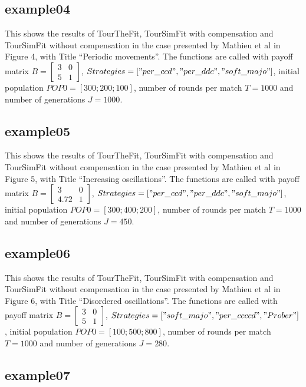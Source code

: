 \documentclass[12pt]{article}
\begin{document}
\subsection{example04}
This shows the results of TourTheFit, TourSimFit with compensation and TourSimFit without compensation in the case presented by Mathieu et al in Figure 4, with Title ``Periodic movements''. The functions are called with payoff matrix $B = \begin{bmatrix} 3 & 0 \\ 5 & 1 \end{bmatrix}$, $Strategies = ["per\_ccd", "per\_ddc", "soft\_majo"]$, initial population $POP0 = [300; 200; 100]$, number of rounds per match $T = 1000$ and number of generations $J = 1000$.

\subsection{example05}
This shows the results of TourTheFit, TourSimFit with compensation and TourSimFit without compensation in the case presented by Mathieu et al in Figure 5, with Title ``Increasing oscillations''. The functions are called with payoff matrix $B = \begin{bmatrix} 3 & 0 \\ 4.72 & 1 \end{bmatrix}$, $Strategies = ["per\_ccd", "per\_ddc", "soft\_majo"]$, initial population $POP0 = [300; 400; 200]$, number of rounds per match $T = 1000$ and number of generations $J = 450$.

\subsection{example06}
This shows the results of TourTheFit, TourSimFit with compensation and TourSimFit without compensation in the case presented by Mathieu et al in Figure 6, with Title ``Disordered oscillations''. The functions are called with payoff matrix $B = \begin{bmatrix} 3 & 0 \\ 5 & 1 \end{bmatrix}$, $Strategies = ["soft\_majo", "per\_ccccd", "Prober"]$, initial population $POP0 = [100; 500; 800]$, number of rounds per match $T = 1000$ and number of generations $J = 280$.

\subsection{example07}
\end{document}
